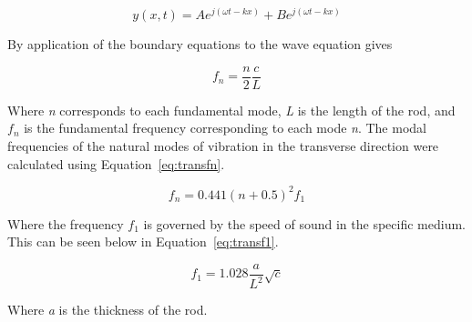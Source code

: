 \begin{equation} \label{eq:waveEQ}
	y(x,t) = A e^{j(\omega t-kx)} + B e^{j(\omega t-kx)}
\end{equation}

By application of the boundary equations to the wave equation gives

\begin{equation} \label{eq:fmodes}
	f_n = \dfrac{n}{2} \dfrac{c}{L}
\end{equation}

Where \emph{n} corresponds to each fundamental mode, \emph{L} is the length of the rod, and \emph{$f_n$} is the fundamental frequency corresponding to each mode \emph{n}. The modal frequencies of the natural modes of vibration in the transverse direction were calculated using Equation~\ref{eq:transfn}.

\begin{equation} \label{eq:transfn}
	f_n = 0.441(n+0.5)^2 f_1
\end{equation}

Where the frequency $f_1$ is governed by the speed of sound in the specific medium. This can be seen below in Equation~\ref{eq:transf1}.

\begin{equation} \label{eq:transf1}
	f_1 = 1.028 \dfrac{a}{L^2} \sqrt{c}
\end{equation}

Where \emph{a} is the thickness of the rod. 
	
